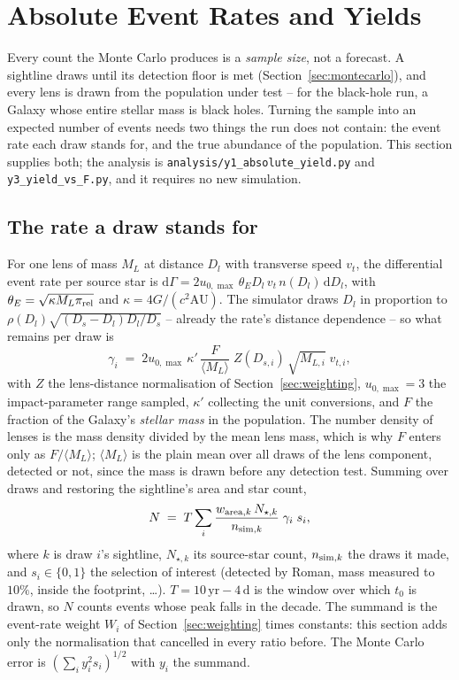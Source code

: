 \documentclass[english,10pt,a4paper]{article}
\begin{document}
	\section{Absolute Event Rates and Yields}
	\label{sec:yields}

	Every count the Monte Carlo produces is a \emph{sample size}, not a forecast. A sightline draws until its detection floor is met (Section~\ref{sec:montecarlo}), and every lens is drawn from the population under test -- for the black-hole run, a Galaxy whose entire stellar mass is black holes. Turning the sample into an expected number of events needs two things the run does not contain: the event rate each draw stands for, and the true abundance of the population. This section supplies both; the analysis is \texttt{analysis/y1\_absolute\_yield.py} and \texttt{y3\_yield\_vs\_F.py}, and it requires no new simulation.

	\subsection{The rate a draw stands for}

	For one lens of mass $M_L$ at distance $D_l$ with transverse speed $v_t$, the differential event rate per source star is $\mathrm{d}\Gamma = 2u_{0,\max}\,\theta_E D_l\,v_t\,n(D_l)\,\mathrm{d}D_l$, with $\theta_E = \sqrt{\kappa M_L\pi_{\rm rel}}$ and $\kappa = 4G/(c^2\mathrm{AU})$. The simulator draws $D_l$ in proportion to $\rho(D_l)\sqrt{(D_s-D_l)D_l/D_s}$ -- already the rate's distance dependence -- so what remains per draw is
	\begin{equation}
		\gamma_i \;=\; 2u_{0,\max}\,\kappa'\,\frac{F}{\langle M_L\rangle}\;Z(D_{s,i})\,\sqrt{M_{L,i}}\;v_{t,i},
		\label{eq:gamma}
	\end{equation}
	with $Z$ the lens-distance normalisation of Section~\ref{sec:weighting}, $u_{0,\max}=3$ the impact-parameter range sampled, $\kappa'$ collecting the unit conversions, and $F$ the fraction of the Galaxy's \emph{stellar mass} in the population. The number density of lenses is the mass density divided by the mean lens mass, which is why $F$ enters only as $F/\langle M_L\rangle$; $\langle M_L\rangle$ is the plain mean over all draws of the lens component, detected or not, since the mass is drawn before any detection test. Summing over draws and restoring the sightline's area and star count,
	\begin{equation}
		N \;=\; T\sum_i \frac{w_{{\rm area},k}\,N_{\star,k}}{n_{{\rm sim},k}}\;\gamma_i\;s_i ,
		\label{eq:yield}
	\end{equation}
	where $k$ is draw $i$'s sightline, $N_{\star,k}$ its source-star count, $n_{{\rm sim},k}$ the draws it made, and $s_i \in\{0,1\}$ the selection of interest (detected by Roman, mass measured to $10\%$, inside the footprint, \ldots). $T = 10\,\mathrm{yr} - 4\,\mathrm{d}$ is the window over which $t_0$ is drawn, so $N$ counts events whose peak falls in the decade. The summand is the event-rate weight $W_i$ of Section~\ref{sec:weighting} times constants: this section adds only the normalisation that cancelled in every ratio before. The Monte Carlo error is $(\sum_i y_i^2 s_i)^{1/2}$ with $y_i$ the summand.
\end{document}
